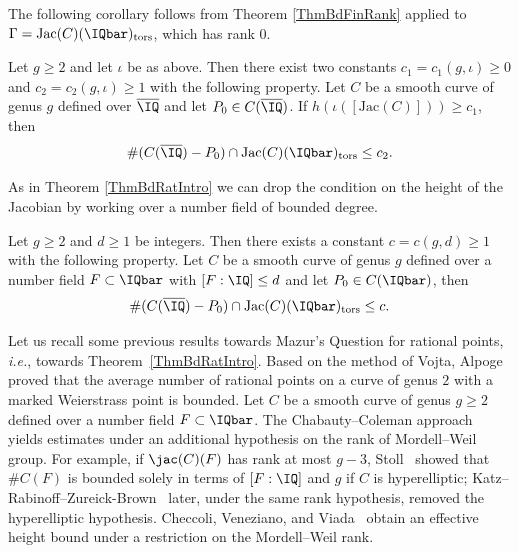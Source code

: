 The following corollary follows from Theorem \ref{ThmBdFinRank} applied to
$\Gamma = \mathrm{Jac}(C)(\IQbar)_{\mathrm{tors}}$, which has rank $0$.


\begin{corollary}
\notready
Let $g \ge 2$ and let $\iota$ be as above.
Then there exist two
constants $c_1= c_1(g,\iota) \ge 0$ and $c_2 = c_2(g,\iota) \ge 1$ with the following property. Let $C$
be a  smooth curve of genus $g$  defined over $\overline \IQ$ and  let $P_0 \in C(\overline \IQ)$.
If $h(\iota([\mathrm{Jac}(C)])) \ge c_1$, then
\[
\# (C(\overline \IQ)-P_0) \cap \mathrm{Jac}(C)(\IQbar)_{\mathrm{tors}}  \le c_2.
\]
\end{corollary}

As in Theorem \ref{ThmBdRatIntro} we can drop the condition on the
height of the Jacobian by working over a number field of bounded
degree.

\begin{theorem}
\notready\label{thm:BdTorIntroNF}
  Let $g \ge 2$ and $d \ge 1$ be integers. Then there exists a constant
  $c = c(g, d) \ge 1$ with the following property. Let $C$ be a
  smooth curve of genus $g$ defined over a
  number field $F\subset\IQbar$
  with $[F:\IQ] \le d$ and let $P_0 \in C(\IQbar)$, then
  \begin{equation*}
    \# (C(\overline \IQ)-P_0) \cap \mathrm{Jac}(C)(\IQbar)_{\mathrm{tors}} \le c.
  \end{equation*}
\end{theorem}

Let us recall some previous results towards Mazur's Question for
rational points, \textit{i.e.}, towards Theorem~\ref{ThmBdRatIntro}.
Based on the method of Vojta, Alpoge~\cite{AlpogeRatPt} proved that
the average number of rational points on a curve of genus $2$ with a
marked Weierstrass point is bounded. Let $C$ be a smooth curve of
genus $g\ge 2$ defined
over a number field $F\subset\IQbar$. The Chabauty--Coleman
approach~\cite{Chabauty,Coleman:effCha} yields estimates under an additional
hypothesis on the rank of Mordell--Weil group. For example, if
$\jac(C)(F)$ has rank at most $g-3$, Stoll~\cite{Stoll:Uniform} showed
that $\#C(F)$ is bounded solely in terms of $[F:\IQ]$ and $g$ if $C$ is
hyperelliptic; Katz--Rabinoff--Zureick-Brown~\cite{KatzRabinoffZB}
later, under the same rank hypothesis, removed the hyperelliptic
hypothesis. Checcoli,
Veneziano, and Viada~\cite{CVV:17} obtain an effective height bound
under a restriction on
 the Mordell--Weil rank.

